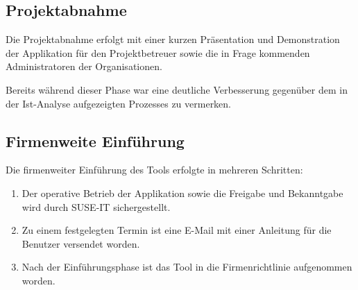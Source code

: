 \subsection{Projektabnahme}
\label{sec:Projektabnahme}
Die Projektabnahme erfolgt mit einer kurzen Präsentation und Demonstration der Applikation für den
Projektbetreuer sowie die in Frage kommenden Administratoren der Organisationen.

Bereits während dieser Phase war eine deutliche Verbesserung gegenüber dem in der Ist-Analyse
aufgezeigten Prozesses zu vermerken.

\subsection{Firmenweite Einführung}
\label{Firmenweite Einführung}
Die firmenweiter Einführung des Tools erfolgte in mehreren Schritten:

\begin{enumerate}
  \item Der operative Betrieb der Applikation sowie die Freigabe und Bekanntgabe wird durch SUSE-IT
  sichergestellt.
  \item Zu einem festgelegten Termin ist eine E-Mail mit einer Anleitung für die Benutzer versendet worden.
  \item Nach der Einführungsphase ist das Tool in die Firmenrichtlinie 
  aufgenommen worden.
\end{enumerate}
\pagebreak
